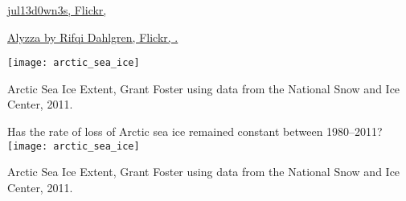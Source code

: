 \documentclass[t]{beamer}
\begin{document}
%

{
\begin{frame}

\vfilll

\hfill \tiny \textcolor{black!30!white}{\href{https://www.flickr.com/photos/31767752@N08/2967148200}{jul13d0wn3s, Flickr, }}
\tiny 
\end{frame}
}

%

{
\begin{frame}

\vfilll

\tiny \textcolor{white}{\href{https://www.flickr.com/photos/rifqidahlgren/7838236492/}{Alyzza by Rifqi Dahlgren, Flickr, .}}
\end{frame}
}

%

\begin{frame}[t]{\phantom{Has the rate of loss of Arctic sea ice remained constant between 1980–2011?}}
\texttt{[image: arctic\_sea\_ice]}

\tinyfill Arctic Sea Ice Extent, Grant Foster using data from the National Snow and Ice Center, 2011. 
\end{frame}

%

\begin{frame}[t]{Has the rate of loss of Arctic sea ice remained constant between 1980–2011?}
\texttt{[image: arctic\_sea\_ice]}

\tinyfill Arctic Sea Ice Extent, Grant Foster using data from the National Snow and Ice Center, 2011. 
\end{frame}

%


{
\begin{frame}[t]
\end{frame}
}

%
\end{document}
